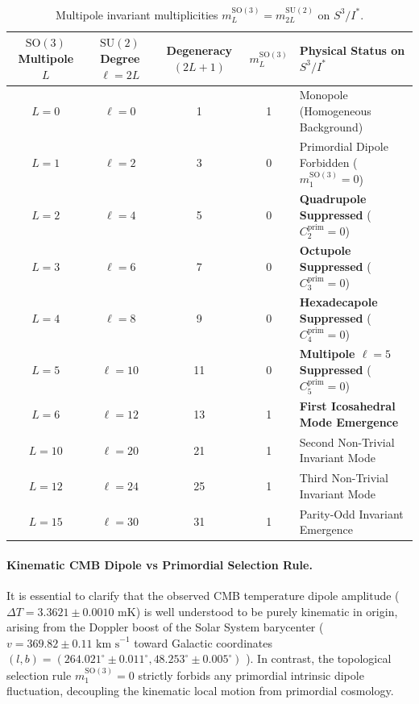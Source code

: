 \documentclass[11pt,a4paper]{article}
\theoremstyle{definition}
\newcommand{\SU}{\mathrm{SU}}
\newcommand{\SO}{\mathrm{SO}}
\newcommand{\PDS}{S^3 / I^*}
\begin{document}
\begin{table}[h]
\centering
\caption{Multipole invariant multiplicities $m_L^{\SO(3)} = m_{2L}^{\SU(2)}$ on $\PDS$.}
\label{tab:multipoles}
\small
\begin{tabular}{ccccl}
\toprule
$\SO(3)$ Multipole $L$ & $\SU(2)$ Degree $\ell=2L$ & Degeneracy $(2L+1)$ & $m_L^{\SO(3)}$ & Physical Status on $\PDS$ \\
\midrule
$L = 0$ & $\ell = 0$ & 1 & 1 & Monopole (Homogeneous Background) \\
$L = 1$ & $\ell = 2$ & 3 & 0 & Primordial Dipole Forbidden ($m_1^{\SO(3)}=0$) \\
$L = 2$ & $\ell = 4$ & 5 & 0 & \textbf{Quadrupole Suppressed} ($C_2^{\mathrm{prim}} = 0$) \\
$L = 3$ & $\ell = 6$ & 7 & 0 & \textbf{Octupole Suppressed} ($C_3^{\mathrm{prim}} = 0$) \\
$L = 4$ & $\ell = 8$ & 9 & 0 & \textbf{Hexadecapole Suppressed} ($C_4^{\mathrm{prim}} = 0$) \\
$L = 5$ & $\ell = 10$ & 11 & 0 & \textbf{Multipole $\ell=5$ Suppressed} ($C_5^{\mathrm{prim}} = 0$) \\
$L = 6$ & $\ell = 12$ & 13 & 1 & \textbf{First Icosahedral Mode Emergence} \\
$L = 10$ & $\ell = 20$ & 21 & 1 & Second Non-Trivial Invariant Mode \\
$L = 12$ & $\ell = 24$ & 25 & 1 & Third Non-Trivial Invariant Mode \\
$L = 15$ & $\ell = 30$ & 31 & 1 & Parity-Odd Invariant Emergence \\
\bottomrule
\end{tabular}
\end{table}

\paragraph{Kinematic CMB Dipole vs Primordial Selection Rule.}
It is essential to clarify that the observed CMB temperature dipole amplitude ($\Delta T = 3.3621 \pm 0.0010\text{ mK}$) is well understood to be purely kinematic in origin, arising from the Doppler boost of the Solar System barycenter ($v = 369.82 \pm 0.11\text{ km s}^{-1}$ toward Galactic coordinates $(l, b) = (264.021^\circ \pm 0.011^\circ, 48.253^\circ \pm 0.005^\circ)$ \cite{Planck2018Params,Kogut1993}). In contrast, the topological selection rule $m_1^{\SO(3)} = 0$ strictly forbids any primordial intrinsic dipole fluctuation, decoupling the kinematic local motion from primordial cosmology.
\end{document}
